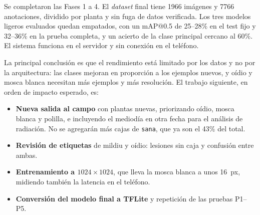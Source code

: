 \documentclass[sensors,article,submit,pdftex,moreauthors]{Definitions/mdpi}
\begin{document}
Se completaron las Fases 1 a 4. El \emph{dataset} final tiene 1966 imágenes y 7766 anotaciones, dividido por planta y sin fuga de datos verificada. Los tres modelos ligeros evaluados quedan empatados, con un mAP@0.5 de 25--28\% en el test fijo y 32--36\% en la prueba completa, y un acierto de la clase principal cercano al 60\%. El sistema funciona en el servidor y sin conexión en el teléfono.

La principal conclusión es que el rendimiento está limitado por los datos y no por la arquitectura: las clases mejoran en proporción a los ejemplos nuevos, y oídio y mosca blanca necesitan más ejemplos y más resolución. El trabajo siguiente, en orden de impacto esperado, es:
\begin{itemize}[leftmargin=*,labelsep=4.9mm]
\item \textbf{Nueva salida al campo} con plantas nuevas, priorizando oídio, mosca blanca y polilla, e incluyendo el mediodía en otra fecha para el análisis de radiación. No se agregarán más cajas de \texttt{sana}, que ya son el 43\% del total.
\item \textbf{Revisión de etiquetas} de mildiu y oídio: lesiones sin caja y confusión entre ambas.
\item \textbf{Entrenamiento a $1024\times1024$}, que lleva la mosca blanca a unos 16~px, midiendo también la latencia en el teléfono.
\item \textbf{Conversión del modelo final a TFLite} y repetición de las pruebas P1--P5.
\end{itemize}

\vspace{6pt}






\end{document}
